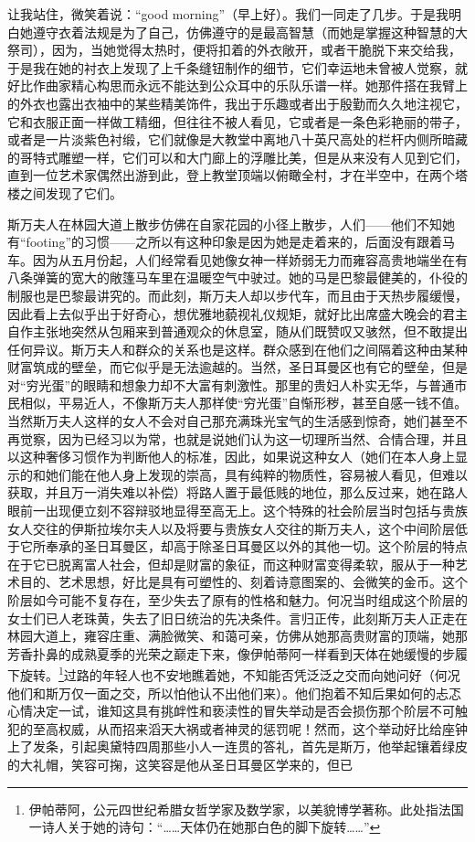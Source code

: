 让我站住，微笑着说：“good morning”（早上好）。我们一同走了几步。于是我明白她遵守衣着法规是为了自己，仿佛遵守的是最高智慧（而她是掌握这种智慧的大祭司），因为，当她觉得太热时，便将扣着的外衣敞开，或者干脆脱下来交给我，于是我在她的衬衣上发现了上千条缝钮制作的细节，它们幸运地未曾被人觉察，就好比作曲家精心构思而永远不能达到公众耳中的乐队乐谱一样。她那件搭在我臂上的外衣也露出衣袖中的某些精美饰件，我出于乐趣或者出于殷勤而久久地注视它，它和衣服正面一样做工精细，但往往不被人看见，它或者是一条色彩艳丽的带子，或者是一片淡紫色衬缎，它们就像是大教堂中离地八十英尺高处的栏杆内侧所暗藏的哥特式雕塑一样，它们可以和大门廊上的浮雕比美，但是从来没有人见到它们，直到一位艺术家偶然出游到此，登上教堂顶端以俯瞰全村，才在半空中，在两个塔楼之间发现了它们。
\par 斯万夫人在林园大道上散步仿佛在自家花园的小径上散步，人们——他们不知她有“footing”的习惯——之所以有这种印象是因为她是走着来的，后面没有跟着马车。因为从五月份起，人们经常看见她像女神一样娇弱无力而雍容高贵地端坐在有八条弹簧的宽大的敞篷马车里在温暖空气中驶过。她的马是巴黎最健美的，仆役的制服也是巴黎最讲究的。而此刻，斯万夫人却以步代车，而且由于天热步履缓慢，因此看上去似乎出于好奇心，想优雅地藐视礼仪规矩，就好比出席盛大晚会的君主自作主张地突然从包厢来到普通观众的休息室，随从们既赞叹又骇然，但不敢提出任何异议。斯万夫人和群众的关系也是这样。群众感到在他们之间隔着这种由某种财富筑成的壁垒，而它似乎是无法逾越的。当然，圣日耳曼区也有它的壁垒，但是对“穷光蛋”的眼睛和想象力却不大富有刺激性。那里的贵妇人朴实无华，与普通市民相似，平易近人，不像斯万夫人那样使“穷光蛋”自惭形秽，甚至自感一钱不值。当然斯万夫人这样的女人不会对自己那充满珠光宝气的生活感到惊奇，她们甚至不再觉察，因为已经习以为常，也就是说她们认为这一切理所当然、合情合理，并且以这种奢侈习惯作为判断他人的标准，因此，如果说这种女人（她们在本人身上显示的和她们能在他人身上发现的崇高，具有纯粹的物质性，容易被人看见，但难以获取，并且万一消失难以补偿）将路人置于最低贱的地位，那么反过来，她在路人眼前一出现便立刻不容辩驳地显得至高无上。这个特殊的社会阶层当时包括与贵族女人交往的伊斯拉埃尔夫人以及将要与贵族女人交往的斯万夫人，这个中间阶层低于它所奉承的圣日耳曼区，却高于除圣日耳曼区以外的其他一切。这个阶层的特点在于它已脱离富人社会，但却是财富的象征，而这种财富变得柔软，服从于一种艺术目的、艺术思想，好比是具有可塑性的、刻着诗意图案的、会微笑的金币。这个阶层如今可能不复存在，至少失去了原有的性格和魅力。何况当时组成这个阶层的女士们已人老珠黄，失去了旧日统治的先决条件。言归正传，此刻斯万夫人正走在林园大道上，雍容庄重、满脸微笑、和蔼可亲，仿佛从她那高贵财富的顶端，她那芳香扑鼻的成熟夏季的光荣之巅走下来，像伊帕蒂阿一样看到天体在她缓慢的步履下旋转。\footnote{伊帕蒂阿，公元四世纪希腊女哲学家及数学家，以美貌博学著称。此处指法国一诗人关于她的诗句：“……天体仍在她那白色的脚下旋转……”}过路的年轻人也不安地瞧着她，不知能否凭泛泛之交而向她问好（何况他们和斯万仅一面之交，所以怕他认不出他们来）。他们抱着不知后果如何的忐忑心情决定一试，谁知这具有挑衅性和亵渎性的冒失举动是否会损伤那个阶层不可触犯的至高权威，从而招来滔天大祸或者神灵的惩罚呢！然而，这个举动好比给座钟上了发条，引起奥黛特四周那些小人一连贯的答礼，首先是斯万，他举起镶着绿皮的大礼帽，笑容可掬，这笑容是他从圣日耳曼区学来的，但已
